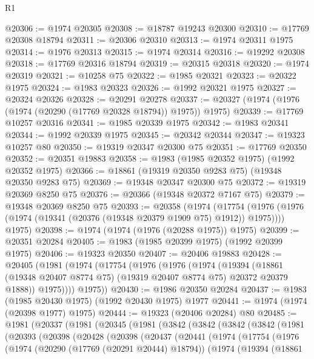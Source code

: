\begin{lexlean}{R1}
\begin{coremodule}
@20306 := @1974 @20305
@20308 := @18787 @19243 @20300
@20310 := @17769 @20308 @18794
@20311 := @20306 @20310
@20313 := @1974 @20311 @1975
@20314 := @1976 @20313
@20315 := @1974 @20314
@20316 := @19292 @20308
@20318 := @17769 @20316 @18794
@20319 := @20315 @20318
@20320 := @1974 @20319
@20321 := @10258 @75
@20322 := @1985 @20321
@20323 := @20322 @1975
@20324 := @1983 @20323
@20326 := @1992 @20321 @1975
@20327 := @20324 @20326
@20328 := @20291 @20278
@20337 := @20327 (@1974 (@1976 (@1974 (@20290 (@17769 @20328 @18794)) @1975)) @1975)
@20339 := @17769 @10257 @20316
@20341 := @1985 @20339 @1975
@20342 := @1983 @20341
@20344 := @1992 @20339 @1975
@20345 := @20342 @20344
@20347 := @19323 @10257 @80
@20350 := @19319 @20347 @20300 @75
@20351 := @17769 @20350
@20352 := @20351 @19883
@20358 := @1983 (@1985 @20352 @1975) (@1992 @20352 @1975)
@20366 := @18861 (@19319 @20350 @9283 @75) (@19348 @20350 @9283 @75)
@20369 := @19348 @20347 @20300 @75
@20372 := @19319 @20369 @8250 @75
@20376 := @20366 (@19348 @20372 @7167 @75)
@20379 := @19348 @20369 @8250 @75
@20393 := @20358
    (@1974
      (@17754 (@1976 (@1976 (@1974 (@19341 (@20376 (@19348 @20379 @1909 @75) @1912)) @1975))))
      @1975)
@20398 := @1974 (@1974 (@1976 (@20288 @1975)) @1975)
@20399 := @20351 @20284
@20405 := @1983 (@1985 @20399 @1975) (@1992 @20399 @1975)
@20406 := @19323 @20350
@20407 := @20406 @19883
@20428 := @20405
    (@1981
      (@1974
        (@17754
          (@1976
            (@1976
              (@1974
                (@19394
                  (@18861 (@19348 @20407 @8774 @75) (@19319 @20407 @8774 @75) @20372 @20379 @1888))
                @1975))))
        @1975))
@20430 := @1986 @20350 @20284
@20437 := @1983 (@1985 @20430 @1975) (@1992 @20430 @1975) @1977
@20441 := @1974 (@1974 (@20398 @1977) @1975)
@20444 := @19323 (@20406 @20284) @80
@20485 := @1981
    (@20337
      (@1981
        (@20345
          (@1981
            (@3842
              (@3842
                (@3842
                  (@3842
                    (@1981
                      (@20393
                        (@20398
                          (@20428
                            (@20398
                              (@20437
                                (@20441
                                  (@1974
                                    (@17754
                                      (@1976
                                        (@1974
                                          (@20290 (@17769 (@20291 @20444) @18794))
                                          (@1974
                                            (@19394
                                              (@18861

\end{coremodule}
\end{lexlean}
